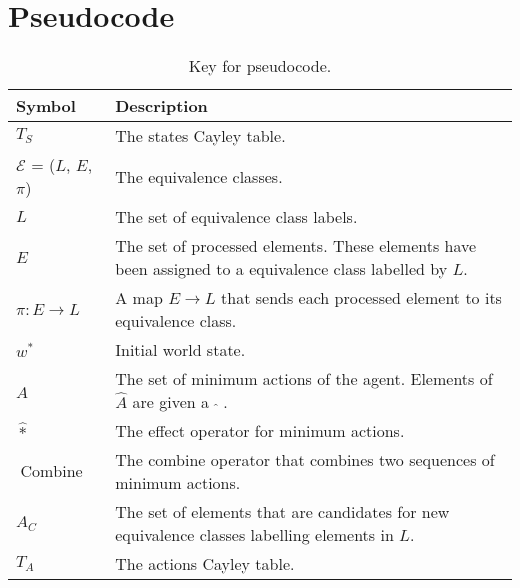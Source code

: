 \section{Pseudocode}

\begin{table}[H]
	\centering
	\begin{tabularx}{\textwidth}{@{}lX@{}}
		\toprule
		\textbf{Symbol}                         & \textbf{Description}                                                                                     \\
		\midrule
		$T_{S}$                                 & The states Cayley table.                                                                                 \\
		$\mathcal{E}$ = ($L$, \; $E$, \; $\pi$) & The equivalence classes.                                                                                 \\
		$L$                                     & The set of equivalence class labels.                                                                     \\
		$E$                                     & The set of processed elements. These elements have been assigned to a equivalence class labelled by $L$. \\
		$\pi: E \to L$                          & A map $E \to L$ that sends each processed element to its equivalence class.                              \\
		$w^{*}$                                 & Initial world state.                                                                                     \\
		$\hat{A}$                               & The set of minimum actions of the agent. Elements of $\hat{A}$ are given a $\; \hat{ } \;$.              \\
		$\hat{*}$                               & The effect operator for minimum actions.                                                                 \\
		$\operatorname{Combine}$                & The combine operator that combines two sequences of minimum actions.                                     \\
		$A_{C}$                                 & The set of elements that are candidates for new equivalence classes labelling elements in $L$.           \\
		$T_{A}$                                 & The actions Cayley table.                                                                                \\
		\bottomrule
	\end{tabularx}
	\caption{Key for pseudocode.}
\end{table}

